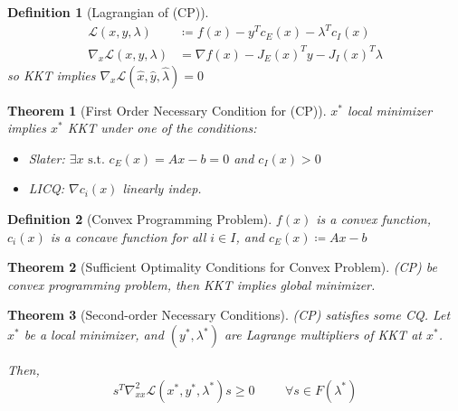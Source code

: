 \documentclass[a4paper]{article}
\newcommand{\Lagrangian}{\mathcal{L}}
\newcommand{\st}{\text{ s.t. }}
\newtheorem{theorem}{Theorem}
\newtheorem*{definition*}{Definition}
\begin{document}
\begin{definition*}[Lagrangian of (CP)]
    \begin{align*}
        \Lagrangian \left( x, y, \lambda \right) &\coloneqq f(x) - y^T c_E (x) - \lambda^T c_I (x) \\
        \nabla_x \Lagrangian \left( x,y, \lambda \right) &= \nabla f(x) - J_E (x)^T y - J_I(x)^T \lambda
    \end{align*}
    so KKT implies $\nabla_{x} \Lagrangian \left( \hat x, \hat y, \hat \lambda \right) = 0$
\end{definition*}

\begin{theorem}[First Order Necessary Condition for (CP)]
    $x^*$ local minimizer implies $x^*$ KKT under one of the conditions:
    \begin{itemize}
        \item Slater: $\exists x \st c_E(x) = Ax - b = 0$ and $c_I(x) > 0$
        \item LICQ: $\nabla c_i (x)$ linearly indep.
    \end{itemize}
\end{theorem}

\begin{definition*}[Convex Programming Problem]
    $f(x)$ is a convex function, $c_i(x)$ is a concave function for all $i \in I$,
    and $c_E(x) \coloneqq Ax - b$
\end{definition*}

\setcounter{theorem}{17}
\begin{theorem}[Sufficient Optimality Conditions for Convex Problem]
    (CP) be convex programming problem, then KKT implies global minimizer.
\end{theorem}

\begin{theorem}[Second-order Necessary Conditions]
    (CP) satisfies some CQ. Let $x^*$ be a local minimizer,
    and $\left( y^*, \lambda^* \right)$ are Lagrange multipliers of KKT at $x^*$.

    Then,
    \begin{equation*}
        s^T \nabla_{xx}^2 \mathcal{L} \left( x^*, y^*, \lambda^* \right) s \geq 0 \hspace{1cm} \forall s \in F \left( \lambda^* \right)
    \end{equation*}
\end{theorem}

\end{document}
